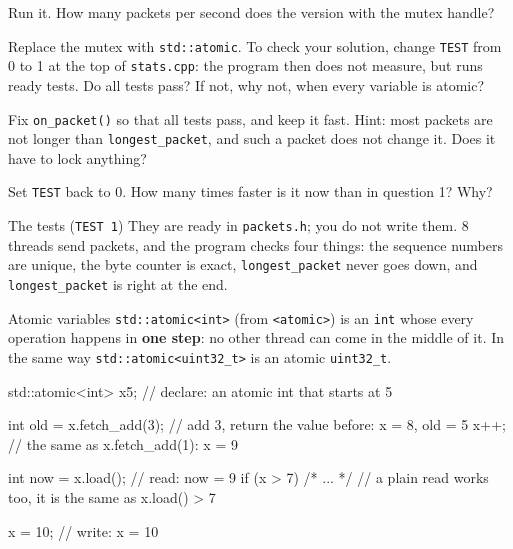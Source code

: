 \begin{questions}
  \item Run it. How many packets per second does the version with the mutex handle?
  \item Replace the mutex with \texttt{std::atomic}. To check your solution, change \texttt{TEST} from 0 to 1 at the
        top of \texttt{stats.cpp}: the program then does not measure, but runs ready tests. Do all tests pass?
        If not, why not, when every variable is atomic?
  \item Fix \texttt{on\_packet()} so that all tests pass, and keep it fast. Hint: most packets are not longer than
        \texttt{longest\_packet}, and such a packet does not change it. Does it have to lock anything?
  \item Set \texttt{TEST} back to 0. How many times faster is it now than in question 1? Why?
\end{questions}

\begin{note}{The tests (\texttt{TEST 1})}
They are ready in \texttt{packets.h}; you do not write them. 8 threads send packets, and the program checks four
things: the sequence numbers are unique, the byte counter is exact, \texttt{longest\_packet} never goes down, and
\texttt{longest\_packet} is right at the end.
\end{note}

\begin{note}{Atomic variables}
\texttt{std::atomic<int>} (from \texttt{<atomic>}) is an \texttt{int} whose every operation happens in
\textbf{one step}: no other thread can come in the middle of it. In the same way \texttt{std::atomic<uint32\_t>}
is an atomic \texttt{uint32\_t}.
\begin{code}
std::atomic<int> x{5};       // declare: an atomic int that starts at 5

int old = x.fetch_add(3);    // add 3, return the value before: x = 8, old = 5
x++;                         // the same as x.fetch_add(1): x = 9

int now = x.load();          // read: now = 9
if (x > 7) { /* ... */ }     // a plain read works too, it is the same as x.load() > 7

x = 10;                      // write: x = 10
\end{code}
\end{note}
